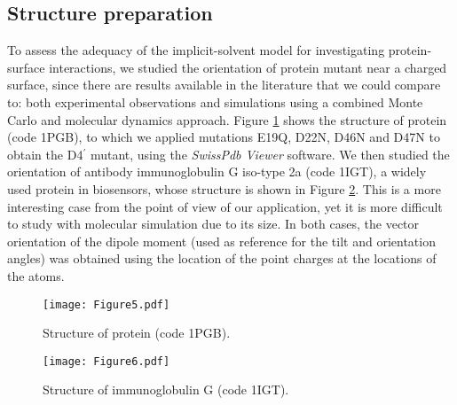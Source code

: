\subsection{Structure preparation}

To assess the adequacy of the implicit-solvent model for investigating protein-surface interactions, we studied the orientation of protein \gb mutant near a charged surface, since there are results available in the literature that we could compare to: both experimental observations \cite{BaioWeidnerBaughGambleStaytonCastner2012} and simulations using a combined Monte Carlo and molecular dynamics approach.\cite{LiuLiaoZhou2013} Figure \ref{fig:1pgb} shows the structure of protein \gb (\pdb code {\small 1PGB}), to which we applied mutations {\small E19Q}, {\small D22N}, {\small D46N} and {\small D47N} to obtain the {\small D4$^\prime$} mutant, using the \textsl{SwissPdb Viewer} software.\cite{GuexPeitsch1997}
We then studied the orientation of antibody immunoglobulin G iso-type \ig 2a (\pdb code {\small 1IGT}), a widely used protein in biosensors, whose structure is shown in Figure \ref{fig:1igt}. This is a more interesting case from the point of view of our application, yet it is more difficult to study with molecular simulation due to its size.
In both cases, the vector orientation of the dipole moment (used as reference for the tilt and orientation angles) was obtained using the location of the point charges at the locations of the atoms.

\begin{figure}%
   \centering
   \texttt{[image: Figure5.pdf]}
   \caption{Structure of protein \gb (\pdb code {\small 1PGB}).}
   \label{fig:1pgb}
\end{figure}

\begin{figure}%
   \centering
   \texttt{[image: Figure6.pdf]}
   \caption{Structure of immunoglobulin G (\pdb code {\small 1IGT}).}
   \label{fig:1igt}
\end{figure}


